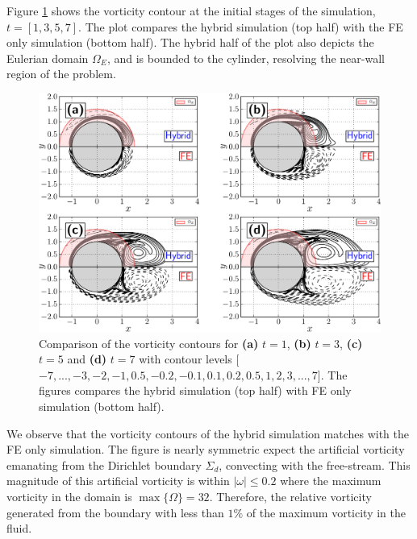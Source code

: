 Figure \ref{fig:hybrid_cylinder_contourComparison_tStarting} shows the vorticity contour at the initial stages of the simulation, $t = [1,3,5,7]$. The plot compares the hybrid simulation (top half) with the FE only simulation (bottom half). The hybrid half of the plot also depicts the Eulerian domain $\Omega_E$, and is bounded to the cylinder, resolving the near-wall region of the problem.

	\begin{figure}[!h]
	\showthe\columnwidth
	\centering
	\includegraphics[width=\linewidth]{./figures/hybrid/isc/hybrid_cylinder_contourComparison_tStarting-crop.pdf}
	\caption{Comparison of the vorticity contours for \textbf{(a)} $t=1$, \textbf{(b)} $t=3$, \textbf{(c)} $t=5$ and \textbf{(d)} $t=7$ with contour levels [$-7,...,-3,-2,-1,0.5,-0.2,-0.1,0.1,0.2,0.5,1,2,3,...,7$]. The figures compares the hybrid simulation (top half) with FE only simulation (bottom half).}
	\label{fig:hybrid_cylinder_contourComparison_tStarting}
	\end{figure}

We observe that the vorticity contours of the hybrid simulation matches with the FE only simulation. The figure is nearly symmetric expect the artificial vorticity emanating from the Dirichlet boundary $\Sigma_d$, convecting with the free-stream. This magnitude of this artificial vorticity is within $|\omega|\leqslant0.2$ where the maximum vorticity in the domain is $\max\{\Omega\}=32$. Therefore, the relative vorticity generated from the boundary with less than $1\%$ of the maximum vorticity in the fluid.

